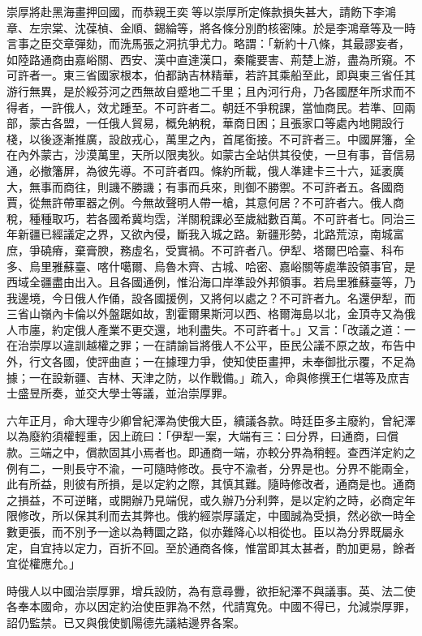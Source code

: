 \begin{pinyinscope}
崇厚將赴黑海畫押回國，而恭親王奕等以崇厚所定條款損失甚大，請飭下李鴻章、左宗棠、沈葆楨、金順、錫綸等，將各條分別酌核密陳。於是李鴻章等及一時言事之臣交章彈劾，而洗馬張之洞抗爭尤力。略謂：「新約十八條，其最謬妄者，如陸路通商由嘉峪關、西安、漢中直達漢口，秦隴要害、荊楚上游，盡為所窺。不可許者一。東三省國家根本，伯都訥吉林精華，若許其乘船至此，即與東三省任其游行無異，是於綏芬河之西無故自蹙地二千里；且內河行舟，乃各國歷年所求而不得者，一許俄人，效尤踵至。不可許者二。朝廷不爭稅課，當恤商民。若準、回兩部，蒙古各盟，一任俄人貿易，概免納稅，華商日困；且張家口等處內地開設行棧，以後逐漸推廣，設啟戎心，萬里之內，首尾銜接。不可許者三。中國屏籓，全在內外蒙古，沙漠萬里，天所以限夷狄。如蒙古全站供其役使，一旦有事，音信易通，必撤籓屏，為彼先導。不可許者四。條約所載，俄人準建卡三十六，延袤廣大，無事而商往，則譏不勝譏；有事而兵來，則御不勝禦。不可許者五。各國商賈，從無許帶軍器之例。今無故聲明人帶一槍，其意何居？不可許者六。俄人商稅，種種取巧，若各國希冀均霑，洋關稅課必至歲絀數百萬。不可許者七。同治三年新疆已經議定之界，又欲內侵，斷我入城之路。新疆形勢，北路荒涼，南城富庶，爭磽瘠，棄膏腴，務虛名，受實禍。不可許者八。伊犁、塔爾巴哈臺、科布多、烏里雅蘇臺、喀什噶爾、烏魯木齊、古城、哈密、嘉峪關等處準設領事官，是西域全疆盡由出入。且各國通例，惟沿海口岸準設外邦領事。若烏里雅蘇臺等，乃我邊境，今日俄人作俑，設各國援例，又將何以處之？不可許者九。名還伊犁，而三省山嶺內卡倫以外盤踞如故，割霍爾果斯河以西、格爾海島以北，金頂寺又為俄人市廛，約定俄人產業不更交還，地利盡失。不可許者十。」又言：「改議之道：一在治崇厚以違訓越權之罪；一在請諭旨將俄人不公平，臣民公議不原之故，布告中外，行文各國，使評曲直；一在據理力爭，使知使臣畫押，未奉御批示覆，不足為據；一在設新疆、吉林、天津之防，以作戰備。」疏入，命與修撰王仁堪等及庶吉士盛昱所奏，並交大學士等議，並治崇厚罪。

六年正月，命大理寺少卿曾紀澤為使俄大臣，續議各款。時廷臣多主廢約，曾紀澤以為廢約須權輕重，因上疏曰：「伊犁一案，大端有三：曰分界，曰通商，曰償款。三端之中，償款固其小焉者也。即通商一端，亦較分界為稍輕。查西洋定約之例有二，一則長守不渝，一可隨時修改。長守不渝者，分界是也。分界不能兩全，此有所益，則彼有所損，是以定約之際，其慎其難。隨時修改者，通商是也。通商之損益，不可逆睹，或開辦乃見端倪，或久辦乃分利弊，是以定約之時，必商定年限修改，所以保其利而去其弊也。俄約經崇厚議定，中國誠為受損，然必欲一時全數更張，而不別予一途以為轉圜之路，似亦難降心以相從也。臣以為分界既屬永定，自宜持以定力，百折不回。至於通商各條，惟當即其太甚者，酌加更易，餘者宜從權應允。」

時俄人以中國治崇厚罪，增兵設防，為有意尋釁，欲拒紀澤不與議事。英、法二使各奉本國命，亦以因定約治使臣罪為不然，代請寬免。中國不得已，允減崇厚罪，詔仍監禁。已又與俄使凱陽德先議結邊界各案。


\end{pinyinscope}
